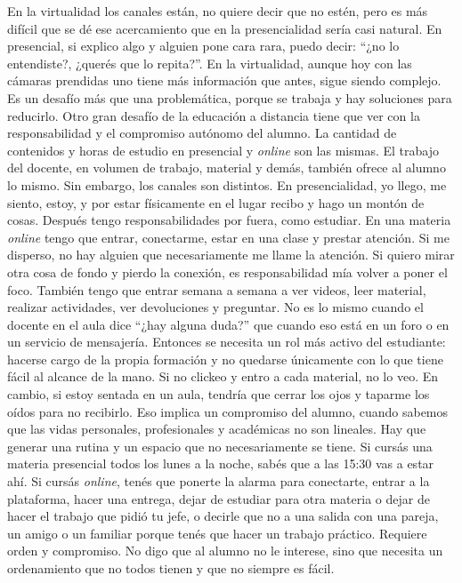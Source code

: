 \begin{description}[leftmargin=0cm, labelsep=0.5cm, style=nextline]
En la virtualidad los canales están, no quiere decir que no estén, pero es más difícil que se dé ese acercamiento que en la presencialidad sería casi natural. En presencial, si explico algo y alguien pone cara rara, puedo decir: ``¿no lo entendiste?, ¿querés que lo repita?''. En la virtualidad, aunque hoy con las cámaras prendidas uno tiene más información que antes, sigue siendo complejo. Es un desafío más que una problemática, porque se trabaja y hay soluciones para reducirlo.
Otro gran desafío de la educación a distancia tiene que ver con la responsabilidad y el compromiso autónomo del alumno. La cantidad de contenidos y horas de estudio en presencial y \textit{online} son las mismas. El trabajo del docente, en volumen de trabajo, material y demás, también ofrece al alumno lo mismo. Sin embargo, los canales son distintos.
En presencialidad, yo llego, me siento, estoy, y por estar físicamente en el lugar recibo y hago un montón de cosas. Después tengo responsabilidades por fuera, como estudiar. En una materia \textit{online} tengo que entrar, conectarme, estar en una clase y prestar atención. Si me disperso, no hay alguien que necesariamente me llame la atención. Si quiero mirar otra cosa de fondo y pierdo la conexión, es responsabilidad mía volver a poner el foco.
También tengo que entrar semana a semana a ver videos, leer material, realizar actividades, ver devoluciones y preguntar. No es lo mismo cuando el docente en el aula dice ``¿hay alguna duda?'' que cuando eso está en un foro o en un servicio de mensajería.
Entonces se necesita un rol más activo del estudiante: hacerse cargo de la propia formación y no quedarse únicamente con lo que tiene fácil al alcance de la mano. Si no clickeo y entro a cada material, no lo veo. En cambio, si estoy sentada en un aula, tendría que cerrar los ojos y taparme los oídos para no recibirlo.
Eso implica un compromiso del alumno, cuando sabemos que las vidas personales, profesionales y académicas no son lineales. Hay que generar una rutina y un espacio que no necesariamente se tiene. Si cursás una materia presencial todos los lunes a la noche, sabés que a las 15:30 vas a estar ahí. Si cursás \textit{online}, tenés que ponerte la alarma para conectarte, entrar a la plataforma, hacer una entrega, dejar de estudiar para otra materia o dejar de hacer el trabajo que pidió tu jefe, o decirle que no a una salida con una pareja, un amigo o un familiar porque tenés que hacer un trabajo práctico.
Requiere orden y compromiso. No digo que al alumno no le interese, sino que necesita un ordenamiento que no todos tienen y que no siempre es fácil.

\end{description}
